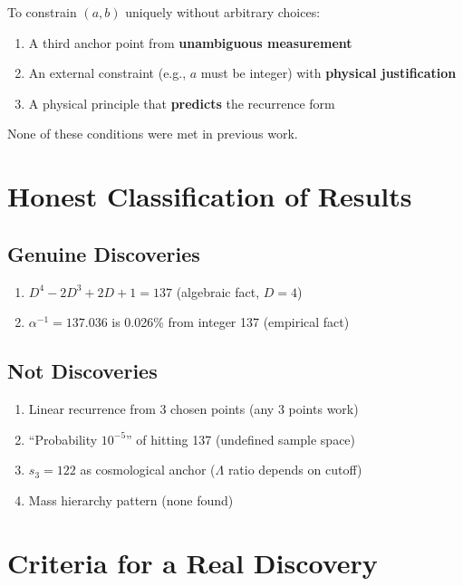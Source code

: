 \documentclass[11pt,a4paper]{article}
\begin{document}
To constrain $(a, b)$ uniquely without arbitrary choices:
\begin{enumerate}
    \item A third anchor point from \textbf{unambiguous measurement}
    \item An external constraint (e.g., $a$ must be integer) with \textbf{physical justification}
    \item A physical principle that \textbf{predicts} the recurrence form
\end{enumerate}

None of these conditions were met in previous work.

\section{Honest Classification of Results}

\subsection{Genuine Discoveries}

\begin{enumerate}
    \item $D^4 - 2D^3 + 2D + 1 = 137$ (algebraic fact, $D=4$)
    \item $\alpha^{-1} = 137.036$ is 0.026\% from integer 137 (empirical fact)
\end{enumerate}

\subsection{Not Discoveries}

\begin{enumerate}
    \item Linear recurrence from 3 chosen points (any 3 points work)
    \item ``Probability $10^{-5}$'' of hitting 137 (undefined sample space)
    \item $s_3 = 122$ as cosmological anchor ($\Lambda$ ratio depends on cutoff)
    \item Mass hierarchy pattern (none found)
\end{enumerate}

\section{Criteria for a Real Discovery}
\end{document}
